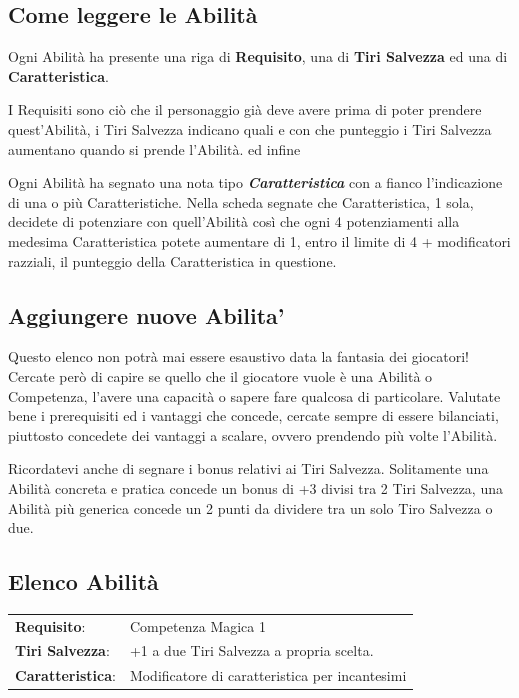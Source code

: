 \begin{multicols}{2}
\subsection{Come leggere le Abilità}\label{tirisalvezzaedabilita}\label{caratteristicheedabilita}

Ogni Abilità ha presente una riga di \textbf{Requisito}, una di \textbf{Tiri Salvezza} ed una di \textbf{Caratteristica}.

I Requisiti sono ciò che il personaggio già deve avere prima di poter prendere quest'Abilità, i Tiri Salvezza indicano quali e con che punteggio i Tiri Salvezza aumentano quando si prende l'Abilità. ed infine

Ogni Abilità ha segnato una nota tipo \emph{\textbf{Caratteristica}} con a fianco l'indicazione di una o più Caratteristiche. Nella scheda segnate che Caratteristica, 1 sola, decidete di potenziare con quell'Abilità così che ogni 4 potenziamenti alla medesima Caratteristica potete aumentare di 1, entro il limite di 4 + modificatori razziali, il punteggio della Caratteristica in questione.

\subsection{Aggiungere nuove Abilita'}\label{aggiungereabilita}

Questo elenco non potrà mai essere esaustivo data la fantasia dei giocatori! Cercate però di capire se quello che il giocatore vuole è una Abilità o Competenza, l'avere una capacità o sapere fare qualcosa di particolare.
Valutate bene i prerequisiti ed i vantaggi che concede, cercate sempre di essere bilanciati, piuttosto concedete dei vantaggi a scalare, ovvero prendendo più volte l'Abilità.

Ricordatevi anche di segnare i bonus relativi ai Tiri Salvezza. Solitamente una Abilità concreta e pratica concede un bonus di +3 divisi tra 2 Tiri Salvezza, una Abilità più generica concede un 2 punti da dividere tra un solo Tiro Salvezza o due.

\subsection{Elenco Abilità}

\hspace{-0.2cm}\begin{tabularx}{\linewidth}{l@{\hspace{8pt}}X}
\rowcolor{gray!20}\textbf{Requisito}: & Competenza Magica 1\\
\textbf{Tiri Salvezza}: & +1 a due Tiri Salvezza a propria scelta.\\
\rowcolor{gray!20}\textbf{Caratteristica}: & Modificatore di caratteristica per incantesimi\\
\end{tabularx}\smallskip


\end{multicols}
